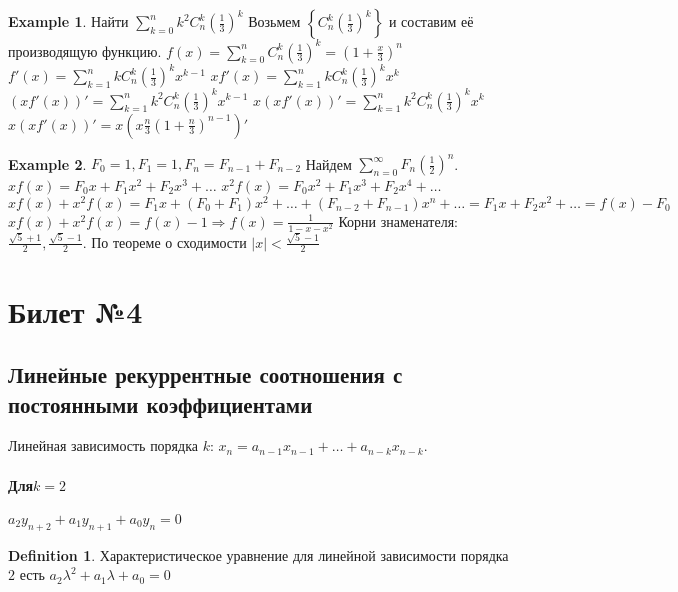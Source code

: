 \documentclass[a4paper]{article}
\theoremstyle{plain}
\theoremstyle{remark}
\theoremstyle{definition}
\newtheorem{definition}{Definition}
\newtheorem{example}{Example}
\newcommand{\combru}[2]{C_{#1}^{#2}} %
\newcommand{\mysum}{\sum\limits}
\newcommand{\myset}[1]{\left\{ #1 \right\}}
\begin{document}
\begin{example}
	Найти $\mysum_{k=0}^n k^2 \combru{n}{k} (\frac{1}{3}) ^ k$ \newline
	Возьмем $\myset{\combru{n}{k} (\frac{1}{3})^k}$ и составим её производящую функцию. \newline
	$f(x) = \mysum_{k=0}^n \combru{n}{k}(\frac{1}{3})^k = (1 + \frac{x}{3})^n$ \newline
	$f'(x) = \mysum_{k=1}^n k \combru{n}{k} (\frac{1}{3})^k x^{k-1}$ \newline
	$x f'(x) = \mysum_{k=1}^n k \combru{n}{k} (\frac{1}{3})^k x^k$ \newline
	$(x f'(x))' = \mysum_{k=1}^n k^2 \combru{n}{k} (\frac{1}{3})^k x^{k-1}$ \newline
	$x (x f'(x))' = \mysum_{k=1}^n k^2 \combru{n}{k} (\frac{1}{3})^k x^k$ \newline
	$x (x f'(x))' = x(x \frac{n}{3}(1 + \frac{n}{3})^{n-1})'$ \newline
\end{example}

\begin{example}
	$F_0 = 1, F_1 = 1, F_n = F_{n-1} + F_{n-2}$
	Найдем $\mysum_{n=0}^{\infty} F_n (\frac{1}{2})^n$. \newline
	$xf(x) = F_0x + F_1x^2 + F_2x^3 + \ldots$ \newline
	$x^2f(x) = F_0x^2 + F_1x^3 + F_2x^4 + \ldots$ \newline
	$xf(x) + x^2f(x) = F_1x + (F_0+F_1)x^2 + \ldots + (F_{n-2} + F_{n-1})x^n + \ldots = F_1x + F_2x^2 + \ldots = f(x) - F_0$ \newline
	$xf(x) + x^2f(x) = f(x) - 1 \Rightarrow f(x) = \frac{1}{1-x-x^2}$ Корни знаменателя: $\frac{\sqrt{5}+1}{2}, \frac{\sqrt{5} - 1}{2}$. По теореме о сходимости $|x| < \frac{\sqrt{5} - 1}{2}$
\end{example}


\section{Билет №4}
\subsection{Линейные рекуррентные соотношения с постоянными коэффициентами}

Линейная зависимость порядка $k$: $x_n = a_{n-1} x_{n-1} + \ldots + a_{n-k} x_{n-k}$.

\paragraph{Для$k=2$} 
$a_2 y_{n+2} + a_1 y_{n+1} + a_0 y_n = 0$
\begin{definition}
	Характеристическое уравнение для линейной зависимости порядка $2$ есть $a_2\lambda^2 + a_1\lambda + a_0 = 0$
\end{definition}
\end{document}
